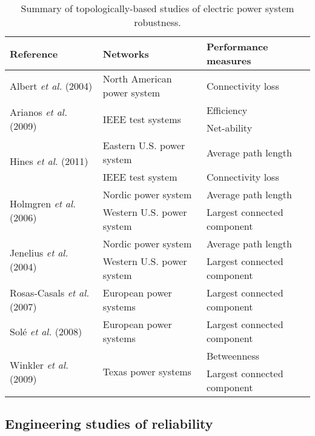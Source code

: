 \begin{table}[h!]
\centering
\footnotesize

\begin{tabular}{lll}
\toprule
\textbf{Reference} & \textbf{Networks} & \textbf{Performance measures}\\
\midrule
Albert \emph{et al.} (2004) & North American power system & Connectivity loss\\
\multirow{2}{*}{Arianos \emph{et al.} (2009)} & \multirow{2}{*}{IEEE test systems} & Efficiency\\
 & & Net-ability\\
\multirow{2}{*}{Hines \emph{et al.} (2011)} & Eastern U.S. power system & Average path length\\
 & IEEE test system & Connectivity loss\\
\multirow{2}{*}{Holmgren \emph{et al.} (2006)} & Nordic power system & Average path length\\
 & Western U.S. power system & Largest connected component\\
\multirow{2}{*}{Jenelius \emph{et al.} (2004)} & Nordic power system & Average path length\\
 & Western U.S. power system & Largest connected component\\
Rosas-Casals \emph{et al.} (2007) & European power systems & Largest connected component\\
Sol\'{e} \emph{et al.} (2008) & European power systems & Largest connected component\\
\multirow{2}{*}{Winkler \emph{et al.} (2009)} & \multirow{2}{*}{Texas power systems} & Betweenness\\
 & & Largest connected component \\
\bottomrule

\end{tabular}

\caption{\label{tab:ch1:electricTopology}Summary of topologically-based studies of electric power system robustness.}
\end{table}



\subsection{Engineering studies of reliability}
\label{sec:ch1:powerreliability:engineering}

